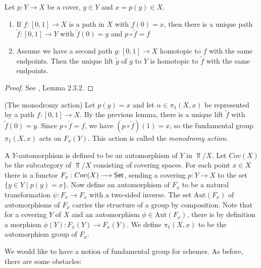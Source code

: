 \begin{lemma}
  Let $p: Y \to X$ be a cover, $y \in Y$ and $x = p(y) \in X$. 
  \begin{enumerate}
    \item If $f: [0,1] \to X$ is a path in $X$ with $f(0) = x$, then there is a unique path $\tilde{f}: [0,1] \to Y$ with $\tilde{f}(0) = y$ and $p \circ \tilde{f} = f$
    \item Assume we have a second path $g: [0,1] \to X$ homotopic to $f$ with the same endpoints. Then the unique lift $\tilde{g}$ of $g$ to $Y$ is homotopic to $\tilde{f}$ with the  same endpoints.
  \end{enumerate}
\end{lemma}
\begin{proof}
  See \cite{Szamuely}, Lemma 2.3.2.
\end{proof}
\begin{construction}(The monodromy action)
  Let $p(y)=x$ and let $\alpha \in \pi_1(X,x)$ be represented by a path $f: [0,1] \to X$. By the previous lemma, there is a unique lift $\tilde{f}$ with $\tilde{f}(0) = y$. Since $p \circ \tilde{f} = f$, we have $(p \circ \tilde{f})(1) = x$, so the fundamental group $\pi_1(X, x)$ acts on $F_x(Y)$. This action is called the \textit{monodromy action}.
\end{construction}

A $Y$-automorphism is defined to be an automorphism of $Y$ in $\Top/X$. Let $Cov(X)$ be the subcategory of $\Top/X$ consisting of covering spaces. For each point $x \in X$ there is a functor $F_x: Cov(X) \longrightarrow \mathsf{Set}$, sending a covering $p: Y \to X$ to the set $\{y \in Y \mid p(y) = x\}$. Now define an automorphism of $F_x$ to be a natural transformation $\psi: F_x \to F_x$ with a two-sided inverse. The set $\text{Aut}(F_x)$ of automorphisms of $F_x$ carries the structure of a group by composition. Note that for a covering $Y$ of $X$ and an automorphism $\phi \in \text{Aut}(F_x)$, there is by definition a morphism $\phi(Y): F_x(Y) \to F_x(Y)$. We define $\pi_1(X,x)$ to be the automorphism group of $F_x$.

We would like to have a notion of fundamental group for schemes. As before, there are some obstacles:

